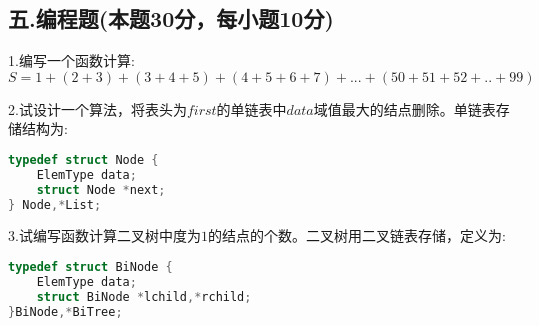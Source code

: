 \subsection{五.编程题(本题30分，每小题10分)}
1.编写一个函数计算: \\
$S=1+(2+3)+(3+4+5)+(4+5+6+7)+...+(50+51+52+..+99)$

2.试设计一个算法，将表头为$first$的单链表中$data$域值最大的结点删除。单链表存储结构为:
\begin{lstlisting}[language=cpp]
typedef struct Node {
    ElemType data;
    struct Node *next;
} Node,*List;
\end{lstlisting}

3.试编写函数计算二叉树中度为$1$的结点的个数。二叉树用二叉链表存储，定义为:
\begin{lstlisting}[language=cpp]
typedef struct BiNode {
    ElemType data;
    struct BiNode *lchild,*rchild;
}BiNode,*BiTree;
\end{lstlisting}
